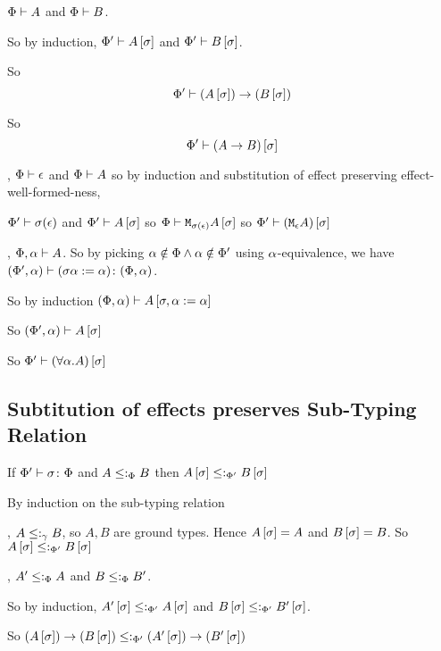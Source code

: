 {    

    \bi $\Phi\vdash A$ and $\Phi\vdash B$.

    So by induction, $\Phi'\vdash A\left[\sigma\right]$ and $\Phi'\vdash B\left[\sigma\right]$.

    So \begin{equation}
        \Phi'\vdash (A\left[\sigma\right])\rightarrow (B\left[\sigma\right])
    \end{equation}

    So \begin{equation}
        \Phi'\vdash (A\rightarrow B)\left[\sigma\right]
    \end{equation}

    


    \bi, $\Phi\vdash \epsilon$ and $\Phi\vdash A$ so by induction and substitution of effect preserving effect-well-formed-ness, 

    $\Phi'\vdash \sigma(\epsilon)$ and $\Phi'\vdash A\left[\sigma\right]$ so $\Phi\vdash \texttt{M}_{\sigma(\epsilon)}{A\left[\sigma\right]}$ so $\Phi'\vdash (\texttt{M}_{\epsilon}{A})\left[\sigma\right]$

    \bi, $\Phi,\alpha\vdash A$. So by picking $\alpha\notin\Phi\wedge\alpha\notin\Phi'$ using $\alpha$-equivalence, we have $(\Phi',\alpha) \vdash (\sigma\alpha:=\alpha) \colon (\Phi,\alpha)$.

    So by induction $(\Phi, \alpha)\vdash A\left[\sigma,\alpha:=\alpha\right]$

    So $(\Phi',\alpha)\vdash A\left[\sigma\right]$

    So $\Phi'\vdash (\forall \alpha. A)\left[\sigma\right]$

    \subsection{Subtitution of effects preserves Sub-Typing Relation}

    If $\Phi' \vdash \sigma \colon \Phi$ and $A\leq:_\Phi B$ then $A\left[\sigma\right]\leq:_{\Phi'} B\left[\sigma\right]$

    \proof
    By induction on the sub-typing relation

    \bi, $A\leq:_\gamma B$, so $A, B$ are ground types.
    Hence $A\left[\sigma\right] = A$ and $B\left[\sigma\right] = B$.
    So $A\left[\sigma\right]\leq:_{\Phi'} B\left[\sigma\right]$

    \bi, $A'\leq:_\Phi A$ and $B\leq:_\Phi B'$.
    
    So by induction, $A'\left[\sigma\right]\leq:_{\Phi'} A\left[\sigma\right]$ and $B\left[\sigma\right]\leq:_{\Phi'} B'\left[\sigma\right]$.

    So $(A\left[\sigma\right])\rightarrow (B\left[\sigma\right])\leq:_{\Phi'} (A'\left[\sigma\right])\rightarrow (B'\left[\sigma\right])$

}
